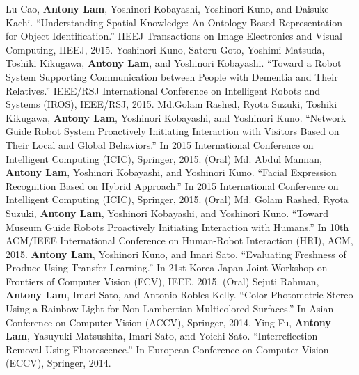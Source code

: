 \documentclass[letterpaper,10pt]{article}
\begin{document}
Lu Cao, \textbf{Antony Lam}, Yoshinori Kobayashi, Yoshinori Kuno, and Daisuke Kachi. ``Understanding Spatial Knowledge: An Ontology-Based Representation for Object Identification.'' IIEEJ Transactions on Image Electronics and Visual Computing, IIEEJ, 2015.\vspace{0.05in}\newline
Yoshinori Kuno, Satoru Goto, Yoshimi Matsuda, Toshiki Kikugawa, \textbf{Antony Lam}, and Yoshinori Kobayashi. ``Toward a Robot System Supporting Communication between People with Dementia and Their Relatives.'' IEEE/RSJ International Conference on Intelligent Robots and Systems (IROS), IEEE/RSJ, 2015.\vspace{0.05in}\newline
Md.Golam Rashed, Ryota Suzuki, Toshiki Kikugawa, \textbf{Antony Lam}, Yoshinori Kobayashi, and Yoshinori Kuno. ``Network Guide Robot System Proactively Initiating Interaction with Visitors Based on Their Local and Global Behaviors.'' In 2015 International Conference on Intelligent Computing (ICIC), Springer, 2015. (Oral)\vspace{0.05in}\newline
Md. Abdul Mannan, \textbf{Antony Lam}, Yoshinori Kobayashi, and Yoshinori Kuno. ``Facial Expression Recognition Based on Hybrid Approach.'' In 2015 International Conference on Intelligent Computing (ICIC), Springer, 2015. (Oral)\vspace{0.05in}\newline
Md. Golam Rashed, Ryota Suzuki, \textbf{Antony Lam}, Yoshinori Kobayashi, and Yoshinori Kuno. ``Toward Museum Guide Robots Proactively Initiating Interaction with Humans.'' In 10th ACM/IEEE International Conference on Human-Robot Interaction (HRI), ACM, 2015.\vspace{0.05in}\newline
\textbf{Antony Lam}, Yoshinori Kuno, and Imari Sato. ``Evaluating Freshness of Produce Using Transfer Learning.'' In  21st Korea-Japan Joint Workshop on Frontiers of Computer Vision (FCV), IEEE, 2015. (Oral)
\vspace{0.05in}\newline
Sejuti Rahman, \textbf{Antony Lam}, Imari Sato, and Antonio Robles-Kelly. ``Color Photometric Stereo Using a Rainbow Light for Non-Lambertian Multicolored Surfaces.'' In Asian Conference on Computer Vision (ACCV), Springer, 2014.
\vspace{0.05in}\newline
Ying Fu, \textbf{Antony Lam}, Yasuyuki Matsushita, Imari Sato, and Yoichi Sato. ``Interreflection Removal Using Fluorescence.'' In European Conference on Computer Vision (ECCV), Springer, 2014.
\end{document}
